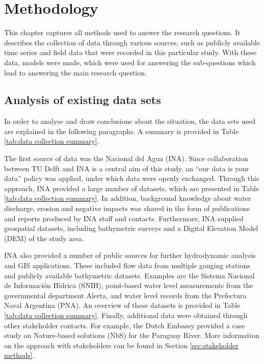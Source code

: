 \chapter{Methodology}
\label{chap:methodology}

This chapter captures all methods used to answer the research questions. It describes the collection of data through various sources, such as publicly available time series and field data that were recorded in this particular study. With these data, models were made, which were used for answering the sub-questions which lead to answering the main research question.

\section{Analysis of existing data sets}
\label{sec:desk study}
In order to analyse and draw conclusions about the situation, the data sets used are explained in the following paragraphs. A summary is provided in Table \ref{tab:data collection summary}.

The first source of data was the \textInstituto Nacional del Agua (INA). Since collaboration between TU Delft and INA is a central aim of this study, an “our data is your data” policy was applied, under which data were openly exchanged. Through this approach, INA provided a large number of datasets, which are presented in Table \ref{tab:data collection summary}. In addition, background knowledge about water discharge, erosion and negative impacts was shared in the form of publications and reports produced by INA staff and contacts. Furthermore, INA supplied geospatial datasets, including bathymetric surveys and a Digital Elevation Model (DEM) of the study area.

INA also provided a number of public sources for further hydrodynamic analysis and GIS applications. These included flow data from multiple gauging stations and publicly available bathymetric datasets. Examples are the Sistema Nacional de Información Hídrica (SNIH), point-based water level measurements from the governmental department Alerta, and water level records from the Prefectura Naval Argentina (PNA). An overview of these datasets is provided in Table \ref{tab:data collection summary}.
Finally, additional data were obtained through other stakeholder contacts. For example, the Dutch Embassy provided a case study on Nature-based solutions (NbS) for the Paraguay River. More information on the approach with stakeholders can be found in Section \ref{sec:stakeholder methods}.

